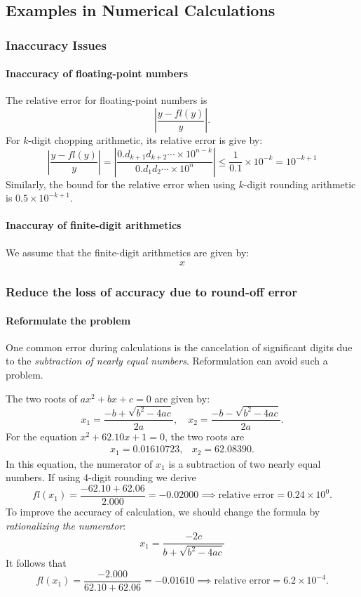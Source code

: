 \subsection{Examples in Numerical Calculations}
\subsubsection{Inaccuracy Issues}
\paragraph{Inaccuracy of floating-point numbers}
The relative error for floating-point numbers is
\[
\left|\frac{y-fl(y)}{y}\right|.
\]
For $k$-digit chopping arithmetic, its relative error is give by:
\[
\left|\frac{y-fl(y)}{y}\right|=\left|\frac{0.d_{k+1}d_{k+2}\cdots\times 10^{n-k}}{0.d_1d_2\cdots\times 10^n}\right|
\le\frac{1}{0.1}\times 10^{-k}=10^{-k+1}
\]
Similarly, the bound for the relative error when using $k$-digit rounding arithmetic is $0.5\times 10^{-k+1}$.

\paragraph{Inaccuray of finite-digit arithmetics}
We assume that the finite-digit arithmetics are given by:
\[
\begin{array}{ll}
x
\end{array}
\]

\subsubsection{Reduce the loss of accuracy due to round-off error}
\paragraph{Reformulate the problem} One common error during calculations is the cancelation of significant digits due to the \emph{subtraction of nearly equal numbers}. Reformulation can avoid such a problem.
\begin{example}
The two roots of $ax^2+bx+c=0$ are given by:
\[
x_1=\frac{-b+\sqrt{b^2-4ac}}{2a},
\quad
x_2=\frac{-b-\sqrt{b^2-4ac}}{2a}.
\]
For the equation $x^2+62.10x+1=0$, the two roots are
\[
\begin{array}{ll}
x_1= 0.01610723,
&
x_2= 62.08390.
\end{array}
\]
In this equation, the numerator of $x_1$ is a subtraction of two nearly equal numbers. If using 4-digit rounding we derive
\[
fl(x_1)=\frac{-62.10+62.06}{2.000}=-0.02000\implies
\mbox{relative error}=0.24\times 10^0.
\]
To improve the accuracy of calculation, we should change the formula by \emph{rationalizing the numerator}:
\[
x_1=\frac{-2c}{b+\sqrt{b^2-4ac}}
\]
It follows that
\[
fl(x_1)=\frac{-2.000}{62.10+62.06}=-0.01610\implies
\mbox{relative error}=6.2\times 10^{-4}.
\]
\end{example}

